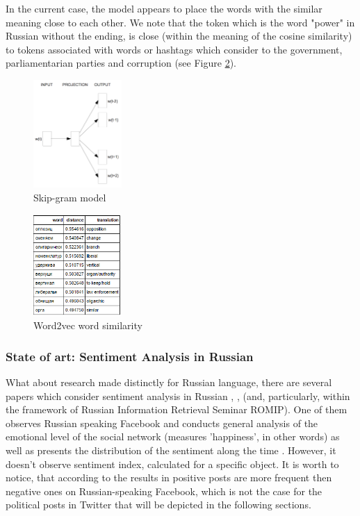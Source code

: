 \documentclass[12pt,a4paper]{article}
\begin{document}
In the current case, the model appears to place the words with the similar meaning close to each other. We note that the token which is the word "power" in Russian without the ending, is close (within the meaning of the cosine similarity) to tokens associated with words or hashtags which consider to the government, parliamentarian parties and corruption (see Figure \ref{fig:simil_vlast}).
\newline
\begin{figure}
\centering
\includegraphics[width=0.3\textwidth]{figures/skip-gram.png}
\caption{Skip-gram model}
\label{fig:skip_gram}
\end{figure}
\newline
\begin{figure}
\centering
\includegraphics[width=0.3\textwidth]{figures/simil_vlast.PNG}
\caption{Word2vec word similarity}
\label{fig:simil_vlast}
\end{figure}

\subsubsection{State of art: Sentiment Analysis in Russian}
What about research made distinctly for Russian language, there are several papers which consider sentiment analysis in Russian \cite{blinov}, \cite{chetviorkin}, \cite{panchenko} (and, particularly, within the framework of Russian Information Retrieval Seminar ROMIP). One of them observes Russian speaking Facebook and conducts general analysis of the emotional level of the social network (measures 'happiness', in other words) as well as presents the distribution of the sentiment along the time \cite{panchenko}. However, it doesn't observe sentiment index, calculated for a specific object. It is worth to notice, that according to the results in \cite{panchenko} positive posts are more frequent then negative ones on Russian-speaking Facebook, which is not the case for the political posts in Twitter that will be depicted in the following sections.
\end{document}
